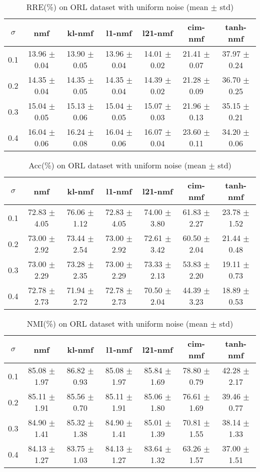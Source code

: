 \documentclass{article} %
\begin{document}
\begin{table}[H]
\begin{tabular}{c|cccccc}$\sigma$ & nmf & kl-nmf & l1-nmf & l21-nmf & cim-nmf & tanh-nmf \\\hline
0.1 & 13.96 $\pm$ 0.04 & 13.90 $\pm$ 0.05 & 13.96 $\pm$ 0.04 & 14.01 $\pm$ 0.02 & 21.41 $\pm$ 0.07 & 37.97 $\pm$ 0.24 \\
0.2 & 14.35 $\pm$ 0.04 & 14.35 $\pm$ 0.05 & 14.35 $\pm$ 0.04 & 14.39 $\pm$ 0.02 & 21.28 $\pm$ 0.09 & 36.70 $\pm$ 0.25 \\
0.3 & 15.04 $\pm$ 0.05 & 15.13 $\pm$ 0.06 & 15.04 $\pm$ 0.05 & 15.07 $\pm$ 0.03 & 21.96 $\pm$ 0.13 & 35.15 $\pm$ 0.21 \\
0.4 & 16.04 $\pm$ 0.06 & 16.24 $\pm$ 0.08 & 16.04 $\pm$ 0.06 & 16.07 $\pm$ 0.04 & 23.60 $\pm$ 0.11 & 34.20 $\pm$ 0.06 \\
\end{tabular}\caption{
  RRE(\%) on ORL dataset with uniform noise (mean $\pm$ std)
  \label{tab:RRE-ORL-uniform}
}\end{table}
\begin{table}[H]
\begin{tabular}{c|cccccc}$\sigma$ & nmf & kl-nmf & l1-nmf & l21-nmf & cim-nmf & tanh-nmf \\\hline
0.1 & 72.83 $\pm$ 4.05 & 76.06 $\pm$ 1.12 & 72.83 $\pm$ 4.05 & 74.00 $\pm$ 3.80 & 61.83 $\pm$ 2.27 & 23.78 $\pm$ 1.52 \\
0.2 & 73.00 $\pm$ 2.92 & 73.44 $\pm$ 2.54 & 73.00 $\pm$ 2.92 & 72.61 $\pm$ 3.42 & 60.50 $\pm$ 2.04 & 21.44 $\pm$ 0.48 \\
0.3 & 73.00 $\pm$ 2.29 & 73.28 $\pm$ 2.35 & 73.00 $\pm$ 2.29 & 73.33 $\pm$ 2.13 & 53.83 $\pm$ 2.20 & 19.11 $\pm$ 0.73 \\
0.4 & 72.78 $\pm$ 2.73 & 71.94 $\pm$ 2.72 & 72.78 $\pm$ 2.73 & 70.50 $\pm$ 2.04 & 44.39 $\pm$ 3.23 & 18.89 $\pm$ 0.53 \\
\end{tabular}\caption{
  Acc(\%) on ORL dataset with uniform noise (mean $\pm$ std)
  \label{tab:Acc-ORL-uniform}
}\end{table}
\begin{table}[H]
\begin{tabular}{c|cccccc}$\sigma$ & nmf & kl-nmf & l1-nmf & l21-nmf & cim-nmf & tanh-nmf \\\hline
0.1 & 85.08 $\pm$ 1.97 & 86.82 $\pm$ 0.93 & 85.08 $\pm$ 1.97 & 85.84 $\pm$ 1.69 & 78.80 $\pm$ 0.79 & 42.28 $\pm$ 2.17 \\
0.2 & 85.11 $\pm$ 1.91 & 85.56 $\pm$ 0.70 & 85.11 $\pm$ 1.91 & 85.06 $\pm$ 1.80 & 76.61 $\pm$ 1.69 & 39.46 $\pm$ 0.77 \\
0.3 & 84.90 $\pm$ 1.41 & 85.32 $\pm$ 1.38 & 84.90 $\pm$ 1.41 & 85.01 $\pm$ 1.39 & 70.81 $\pm$ 1.55 & 38.14 $\pm$ 1.33 \\
0.4 & 84.13 $\pm$ 1.27 & 83.75 $\pm$ 1.03 & 84.13 $\pm$ 1.27 & 83.64 $\pm$ 1.32 & 63.26 $\pm$ 1.57 & 37.00 $\pm$ 1.51 \\
\end{tabular}\caption{
  NMI(\%) on ORL dataset with uniform noise (mean $\pm$ std)
  \label{tab:NMI-ORL-uniform}
}\end{table}
\end{document}
